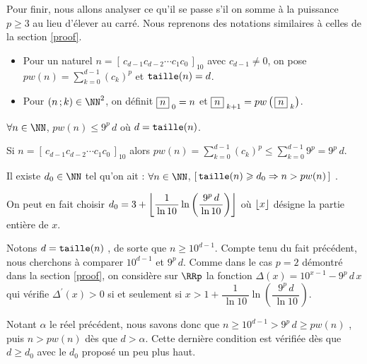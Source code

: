 Pour finir, nous allons analyser ce qu'il se passe s'il on somme à la puissance $p \geqslant 3$ au lieu d'élever au carré.
Nous reprenons des notations similaires à celles de la section \ref{proof}.
\begin{itemize}[label = \textbullet]
	\item Pour un naturel $n =  \left[ \, c_{d-1} c_{d-2} \cdots c_1 c_0 \, \right]_{10}$ avec $c_{d-1} \neq 0$,
	on pose
	$\displaystyle pw(n) = \sum_{k=0}^{d-1} (c_k)^p$
	et
	$\operatorname{\text{\normalfont\texttt{taille}}}(n) = d$.
	
	\item Pour $(n \,; k) \in \NN^2$, on définit 
	$\fbox{$n$}_{\,\,0} = n$
	et
	$\fbox{$n$}_{\,\,k+1} = pw \left( \, \fbox{$n$}_{\,\,k} \right)$.
\end{itemize}

 

\bigskip

\begin{fact}
	$\forall n \in \NN$, $pw(n) \leqslant 9^p \, d$ où $d = \operatorname{\text{\normalfont\texttt{taille}}}(n)$.
\end{fact}

\begin{proof*}
	Si $n = \left[ \, c_{d-1} c_{d-2} \cdots c_1 c_0 \, \right]_{10}$
	alors 
	$\displaystyle pw(n) = \sum_{k=0}^{d-1} (c_k)^p \leqslant \sum_{k=0}^{d-1} 9^p = 9^p \, d $.
\end{proof*}




\medskip

\begin{fact}\label{magicmajo}
	Il existe $d_0 \in \NN$ tel qu'on ait : $\forall n \in \NN$,	
	$[ \, \operatorname{\text{\normalfont\texttt{taille}}}(n) \geqslant d_0 \Rightarrow n > pw(n) \, ]$ .
	
	\smallskip
	On peut en fait choisir $d_0 = 3 + \left\lfloor \dfrac{1}{\, \ln 10 \,} \ln \left( \dfrac{ \, 9^p \, d \, }{\, \ln 10 \,} \right) \right\rfloor$
	où $\left\lfloor x \right\rfloor$ désigne la partie entière de $x$.
\end{fact}

\begin{proof*}
	Notons $d = \operatorname{\text{\normalfont\texttt{taille}}}(n)$ , de sorte que $n \geqslant 10^{d-1}$.
	Compte tenu du fait précédent, nous cherchons à comparer $10^{d-1}$ et $9^p \, d$.
	Comme dans le cas $p = 2$ démontré dans la section \ref{proof}, on considère sur $\RRp$ la fonction $\Delta(x) = 10^{x-1} - 9^p \, d \, x$
	qui vérifie $\Delta^\prime(x) > 0$ 
	si et seulement si
	$x > 1 + \dfrac{1}{\, \ln 10 \,} \ln \left( \dfrac{ \, 9^p \, d \, }{\, \ln 10 \,} \right)$.
	
	
	\medskip
	
	Notant $\alpha$ le réel précédent, nous savons donc que $n \geqslant 10^{d-1} > 9^p \, d \geqslant pw(n)$ ,
	puis $n > pw(n)$ dès que $d > \alpha$.
	Cette dernière condition est vérifiée dès que $d \geqslant d_0$ avec le $d_0$ proposé un peu plus haut.
\end{proof*}




